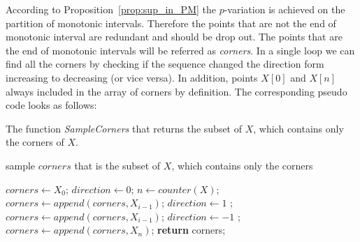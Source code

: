 \documentclass[12pt, a4paper]{article}
\numberwithin{equation}{section}
\begin{document}
According to Proposition~\ref{prop:sup_in_PM}
the $p$-variation is achieved 
on the partition of monotonic intervals.
Therefore the points that are not 
the end of monotonic interval are redundant 
and should be drop out.
The points that are the end of monotonic intervals
will be referred as \emph{corners}. 
In a single loop we can 
find all the corners by checking if the sequence
changed the direction form increasing to decreasing
(or vice versa). In addition, points $X[0]$ and $X[n]$
always included in the array of corners by definition.
The corresponding pseudo code looks as follows:


\begin{algorithm}[H]
\caption{The function \emph{SampleCorners} that
returns the subset of $X$, which contains only the corners of $X$.}
\label{alg:SampleCorners}
\begin{algorithmic}[1]
\Output sample $corners$ that is the subset of $X$, which contains only the corners

\State $corners \leftarrow X_0$;
\State $direction \leftarrow 0$;
\State $n \leftarrow counter(X)$;
      \State $corners \leftarrow append(corners, X_{i-1})$;
    \EndIf
    \State $direction \leftarrow 1$ ;
  \EndIf
      \State $corners \leftarrow append(corners, X_{i-1})$;
    \EndIf
    \State $direction \leftarrow -1$ ;
  \EndIf   
\EndFor
\State $corners \leftarrow append(corners, X_{n})$; 
\State \textbf{return} corners;
\EndFunction
\end{algorithmic}
\end{algorithm}


%
\end{document}
